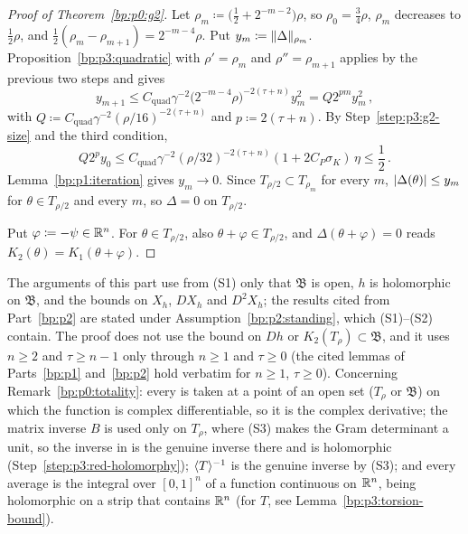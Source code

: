 \begin{proof}[Proof of Theorem~\ref{bp:p0:g2}]
\label{step:p3:g2-iteration}
Let $\rho_m\coloneqq\bigl(\frac12+2^{-m-2}\bigr)\rho$, so $\rho_0=\frac34\rho$, $\rho_m$ decreases to
$\frac12\rho$, and $\frac12(\rho_m-\rho_{m+1})=2^{-m-4}\rho$. Put $y_m\coloneqq\lVert \Delta\rVert_{\rho_m}$.
Proposition~\ref{bp:p3:quadratic} with $\rho'=\rho_m$ and $\rho''=\rho_{m+1}$ applies by the previous two
steps and gives
\begin{equation*}
y_{m+1}\le C_{\mathrm{quad}}\gamma^{-2}\bigl(2^{-m-4}\rho\bigr)^{-2(\tau+n)}y_m^2=Q2^{pm}y_m^2\,,
\end{equation*}
with $Q\coloneqq C_{\mathrm{quad}}\gamma^{-2}(\rho/16)^{-2(\tau+n)}$ and $p\coloneqq2(\tau+n)$.
By Step~\ref{step:p3:g2-size} and the third condition,
\begin{equation*}
Q2^py_0\le C_{\mathrm{quad}}\gamma^{-2}(\rho/32)^{-2(\tau+n)}(1+2C_P\sigma_K)\,\eta\le\frac12\,.
\end{equation*}
Lemma~\ref{bp:p1:iteration} gives $y_m\to0$. Since $T_{\rho/2}\subset T_{\rho_m}$ for every $m$,
$\lvert \Delta(\theta)\rvert\le y_m$ for $\theta\in T_{\rho/2}$ and every $m$, so $\Delta=0$ on $T_{\rho/2}$.

\label{step:p3:g2-conclusion}
Put $\varphi\coloneqq-\psi\in\mathbb{R}^n$. For $\theta\in T_{\rho/2}$, also $\theta+\varphi\in T_{\rho/2}$, and
$\Delta(\theta+\varphi)=0$ reads $K_2(\theta)=K_1(\theta+\varphi)$.
\end{proof}

\begin{remark}\label{bp:p3:totality-check}
The arguments of this part use from (S1) only that $\mathfrak B$ is open, $h$ is holomorphic on
$\mathfrak B$, and the bounds on $X_h$, $DX_h$ and $D^2X_h$; the results cited from Part~\ref{bp:p2} are
stated under Assumption~\ref{bp:p2:standing}, which (S1)--(S2) contain. The proof does not use the bound
on $Dh$ or $K_2(T_\rho)\subset\mathfrak B$, and it uses $n\ge2$ and $\tau\ge n-1$ only through $n\ge1$ and
$\tau\ge0$ (the cited lemmas of Parts~\ref{bp:p1} and~\ref{bp:p2} hold verbatim for $n\ge1$,
$\tau\ge0$). Concerning
Remark~\ref{bp:p0:totality}: every  is taken at a point of an open set ($T_\rho$ or
$\mathfrak B$) on which the function is complex differentiable, so it is the complex derivative; the
matrix inverse $B$ is used only on $T_\rho$, where (S3) makes the Gram determinant a unit, so the
inverse in  is the genuine inverse there and is holomorphic (Step~\ref{step:p3:red-holomorphy});
$\langle T\rangle^{-1}$ is the genuine inverse by (S3); and every average is the integral over $[0,1]^n$ of a
function continuous on $\mathbb{R}^n$, being holomorphic on a strip that contains $\mathbb{R}^n$ (for $T$, see
Lemma~\ref{bp:p3:torsion-bound}).
\end{remark}

